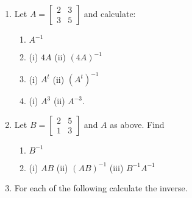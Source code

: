 \documentclass[12pt]{article}
\begin{document}
\iffalse
\begin{enumerate}
\item  Let $A=\left[
\begin{array}{rr}
2 & 3 \\ 3 & 5 \end{array} \right ]$ and calculate:
\begin{enumerate}
\item $A^{-1}$
\item (i) $4A$ \quad (ii) $(4A)^{-1}$
\item (i) $A^t$ \quad (ii) $(A^t)^{-1}$
\item (i) $A^3$ \quad (ii) $A^{-3}.$
\end{enumerate}
\item Let $B= \left[
{\begin{array}{rr}
2 & 5 \\
1 & 3
\end{array}}
 \right]$ and $A$ as above. Find
\begin{enumerate}
\item $B^{-1}$
\item (i) $AB$ \quad (ii) $(AB)^{-1}$ \quad (iii) $B^{-1}A^{-1}$
\end{enumerate}
\item For each of the following calculate the inverse.
\begin{enumerate}
\item $\left[ {\begin{array}{rrr} 1 & 0 & 2 \\ 2 & -1 & 3 \\ 4 & 1 &
8
\end{array}}
 \right]$
\item $\left[ {\begin{array}{rrr} 1 & 2 & 1 \\ 1 & 1 & 1 \\ 3 & -1 &
1
\end{array}}
 \right]$
\item $ \left[ {\begin{array}{rrr} 1 & 3 & -4 \\ 1 & 5 & -1 \\ 3 &
13 & -6
\end{array}}
 \right]
$
\item $\left[ {\begin{array}{rrr} 0 & 1 & 1 \\ 5 & 1 & -1 \\ 2 & -3
& -3
\end{array}}
 \right]$
\item $\left [\begin {array}{rrrr} 1&0&0&0\\2&-2&0&0

\end{array}
\end{enumerate}
\end{enumerate}
\end{document}
